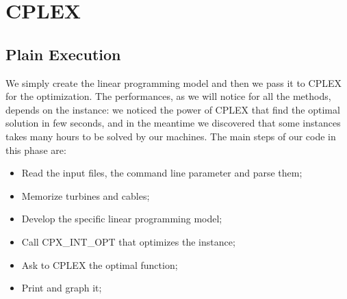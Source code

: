 
\chapter{CPLEX}

\label{chp:3-CPLEX}

\section{Plain Execution}
We simply create the linear programming model and then we pass it to CPLEX for the optimization. The performances, as we will notice for all the methods, depends on the instance: we noticed the power of CPLEX that find the optimal solution in few seconds, and in the meantime we discovered that some instances takes many hours to be solved by our machines. 
The main steps of our code in this phase are: 
\begin{itemize}
\item Read the input files, the command line parameter and parse them;
\item Memorize turbines and cables;
\item Develop the specific linear programming model;
\item Call CPX\_INT\_OPT that optimizes the instance;
\item Ask to CPLEX the optimal function;
\item Print and graph it;
\end{itemize}

